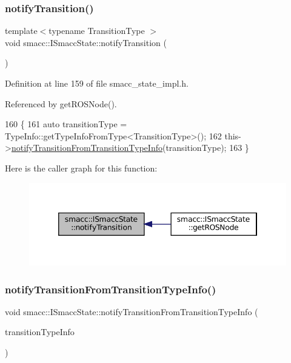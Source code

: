 \subsubsection{\texorpdfstring{notify\+Transition()}{notifyTransition()}}
{\footnotesize\ttfamily template$<$typename Transition\+Type $>$ \\
void smacc\+::\+I\+Smacc\+State\+::notify\+Transition (\begin{DoxyParamCaption}{ }\end{DoxyParamCaption})}



Definition at line 159 of file smacc\+\_\+state\+\_\+impl.\+h.



Referenced by get\+R\+O\+S\+Node().


\begin{DoxyCode}
160 \{
161     \textcolor{keyword}{auto} transitionType = TypeInfo::getTypeInfoFromType<TransitionType>();
162     this->\hyperlink{classsmacc_1_1ISmaccState_acb3dd7d402c634004ae3b67a01169438}{notifyTransitionFromTransitionTypeInfo}(transitionType);
163 \}
\end{DoxyCode}
Here is the caller graph for this function\+:
\nopagebreak
\begin{figure}[H]
\begin{center}
\leavevmode
\includegraphics[width=346pt]{classsmacc_1_1ISmaccState_a98df316afd79180d3c27a15a7d5dd1cf_icgraph}
\end{center}
\end{figure}
\mbox{\label{classsmacc_1_1ISmaccState_acb3dd7d402c634004ae3b67a01169438}} 
\subsubsection{\texorpdfstring{notify\+Transition\+From\+Transition\+Type\+Info()}{notifyTransitionFromTransitionTypeInfo()}}
{\footnotesize\ttfamily void smacc\+::\+I\+Smacc\+State\+::notify\+Transition\+From\+Transition\+Type\+Info (\begin{DoxyParamCaption}\item[{std\+::shared\+\_\+ptr$<$ \hyperlink{classsmacc_1_1introspection_1_1TypeInfo}{smacc\+::introspection\+::\+Type\+Info} $>$ \&}]{transition\+Type\+Info }\end{DoxyParamCaption})}



